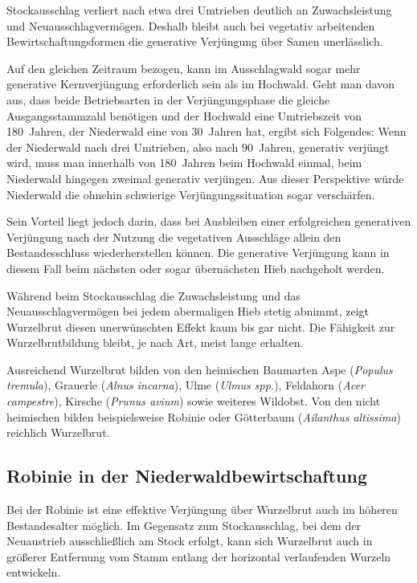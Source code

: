 \documentclass[twocolumn]{scrartcl}
\begin{document}
Stockausschlag verliert nach etwa drei Umtrieben deutlich an
Zuwachsleistung und Neuausschlagvermögen. Deshalb bleibt auch bei
vegetativ arbeitenden Bewirtschaftungsformen die generative Verjüngung
über Samen unerlässlich.

Auf den gleichen Zeitraum bezogen, kann im Ausschlagwald sogar mehr
generative Kernverjüngung erforderlich sein als im Hochwald. Geht man
davon aus, dass beide Betriebsarten in der Verjüngungsphase die
gleiche Ausgangsstammzahl benötigen und der Hochwald eine Umtriebszeit
von 180~Jahren, der Niederwald eine von 30~Jahren hat, ergibt sich
Folgendes: Wenn der Niederwald nach drei Umtrieben, also nach
90~Jahren, generativ verjüngt wird, muss man innerhalb von 180~Jahren
beim Hochwald einmal, beim Niederwald hingegen zweimal generativ
verjüngen. Aus dieser Perspektive würde Niederwald die ohnehin
schwierige Verjüngungssituation sogar verschärfen.

Sein Vorteil liegt jedoch darin, dass bei Ausbleiben einer
erfolgreichen generativen Verjüngung nach der Nutzung die vegetativen
Ausschläge allein den Bestandesschluss wiederherstellen können. Die
generative Verjüngung kann in diesem Fall beim nächsten oder sogar
übernächsten Hieb nachgeholt werden.

Während beim Stockausschlag die Zuwachsleistung und das
Neuausschlagvermögen bei jedem abermaligen Hieb stetig abnimmt, zeigt
Wurzelbrut diesen unerwünschten Effekt kaum bis gar nicht. Die
Fähigkeit zur Wurzelbrutbildung bleibt, je nach Art, meist lange
erhalten.

Ausreichend Wurzelbrut bilden von den heimischen Baumarten Aspe
(\emph{Populus tremula}), Grauerle (\emph{Alnus incarna}), Ulme
(\emph{Ulmus spp.}), Feldahorn (\emph{Acer campestre}), Kirsche
(\emph{Prunus avium}) sowie weiteres Wildobst. Von den nicht
heimischen bilden beispielsweise Robinie oder Götterbaum
(\emph{Ailanthus altissima}) reichlich Wurzelbrut.

\subsection{Robinie in der Niederwaldbewirtschaftung}

Bei der Robinie ist eine effektive Verjüngung über Wurzelbrut auch im
höheren Bestandesalter möglich. Im Gegensatz zum Stockausschlag, bei
dem der Neuaustrieb ausschließlich am Stock erfolgt, kann sich
Wurzelbrut auch in größerer Entfernung vom Stamm entlang der
horizontal verlaufenden Wurzeln entwickeln.
\end{document}

